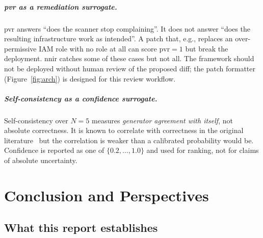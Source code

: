 \documentclass[12pt, a4paper]{report}
\begin{document}
\paragraph{\gls{pvr} as a remediation surrogate.}
\gls{pvr} answers ``does the scanner stop complaining''. It does not
answer ``does the resulting infrastructure work as intended''. A patch
that, e.g., replaces an over-permissive IAM role with no role at all
can score $\mathrm{pvr}=1$ but break the deployment. \gls{nnir} catches
some of these cases but not all. The framework should not be deployed
without human review of the proposed diff; the patch formatter
(Figure~\ref{fig:arch}) is designed for this review workflow.

\paragraph{Self-consistency as a confidence surrogate.}
Self-consistency over $N=5$ measures \emph{generator agreement with
itself}, not absolute correctness. It is known to correlate with
correctness in the original literature~\citep{wang2023selfconsistency}
but the correlation is weaker than a calibrated probability would be.
Confidence is reported as one of $\{0.2, \ldots, 1.0\}$ and used for
ranking, not for claims of absolute uncertainty.

\chapter{Conclusion and Perspectives}
\label{chap:conclusion}

\section{What this report establishes}
\end{document}
